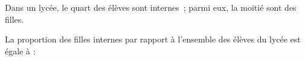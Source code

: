 
Dans un lycée, le quart des élèves sont internes~; parmi eux, la moitié sont des filles.

La proportion des filles internes par rapport à l'ensemble des élèves du lycée est égale à :

\smallskip

